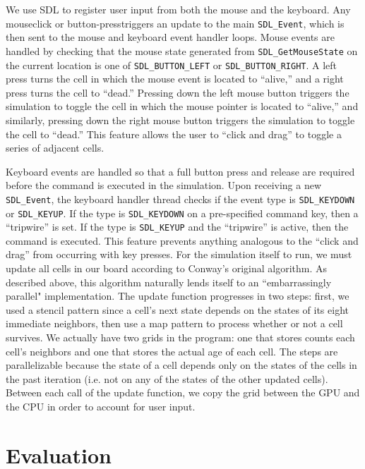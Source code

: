\documentclass[onecolumn,12pt]{IEEEtran}
\begin{document}
  We use SDL to register user input from both the mouse and the keyboard. Any
  mouseclick or button-presstriggers an update to the main \texttt{SDL\_Event},
  which is then sent to the mouse and keyboard event handler loops. Mouse events
  are handled by checking that the mouse state generated from
  \texttt{SDL\_GetMouseState} on the current location is one of
  \texttt{SDL\_BUTTON\_LEFT} or \texttt{SDL\_BUTTON\_RIGHT}. A left press turns
  the cell in which the mouse event is located to ``alive,'' and a right press
  turns the cell to ``dead.'' Pressing down the left mouse button triggers the
  simulation to toggle the cell in which the mouse pointer is located to
  ``alive,'' and similarly, pressing down the right mouse button triggers the
  simulation to toggle the cell to ``dead.'' This feature allows the user to
  ``click and drag'' to toggle a series of adjacent cells.

  Keyboard events are handled so that a full button press and release are
  required before the command is executed in the simulation. Upon receiving a new
  \texttt{SDL\_Event}, the keyboard handler thread checks if the event type is
  \texttt{SDL\_KEYDOWN} or \texttt{SDL\_KEYUP}. If the type is
  \texttt{SDL\_KEYDOWN} on a pre-specified command key, then a ``tripwire'' is
  set. If the type is \texttt{SDL\_KEYUP} and the ``tripwire'' is active, then
  the command is executed. This feature prevents anything analogous to the
  ``click and drag'' from occurring with key presses.  For the simulation itself to run, we must update all cells in our board
  according to Conway's original algorithm. As described above, this algorithm
  naturally lends itself to an ``embarrassingly parallel" implementation. The
  update function progresses in two steps: first, we used a stencil pattern since
  a cell's next state depends on the states of its eight immediate neighbors,
  then use a map pattern to process whether or not a cell survives. We actually
  have two grids in the program: one that stores counts each cell's neighbors and
  one that stores the actual age of each cell. The steps are parallelizable
  because the state of a cell depends only on the states of the cells in the past
  iteration (i.e. not on any of the states of the other updated cells). Between
  each call of the update function, we copy the grid between the GPU and the CPU
  in order to account for user input.

  \section{Evaluation}
\end{document}
